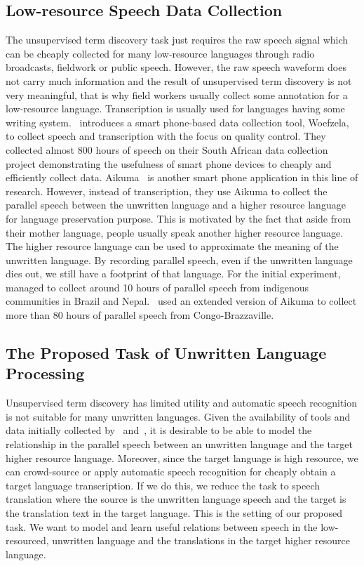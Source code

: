 \documentclass[12pt,twoside,final,hidelinks]{ltthesis}
\theoremstyle{definition}
\begin{document}
\subsection{Low-resource Speech Data Collection}
The unsupervised term discovery task just requires the raw speech signal which can be cheaply collected for many low-resource languages through radio broadcasts, fieldwork 
or public speech. However, the raw speech waveform does not carry much information and the result of unsupervised term discovery is not very meaningful, that is why field workers usually collect some annotation for a low-resource 
language. Transcription is usually used for languages having some writing system.~ introduces a smart phone-based data collection tool, 
Woefzela, to collect speech and transcription with the focus on quality control. They collected almost 800 hours of speech on their South African data collection 
project demonstrating the usefulness of smart phone devices to cheaply and efficiently collect data. Aikuma~\cite{bird-EtAl:2014:W14-22} is another smart phone application in this 
line of research. However, instead of transcription, they use Aikuma to collect the parallel speech between the unwritten language and a higher resource language for language preservation purpose. This 
is motivated by the fact that aside from their mother language, people usually speak another higher resource language. The higher resource language can be used to 
approximate the meaning of the unwritten language. By recording parallel speech, even if the unwritten language dies out, we still have a footprint of that 
language. For the initial experiment,~ managed to collect around 10 hours of parallel speech from indigenous 
communities in Brazil and Nepal.~ used an extended version of Aikuma to collect more than 80 hours of parallel speech from Congo-Brazzaville. 

\subsection{The Proposed Task of Unwritten Language Processing}
\label{sec:proposed_tasks_unwritten}
Unsupervised term discovery has limited utility and automatic speech recognition is not suitable for many unwritten languages. Given the availability of tools and data initially collected by~ and~, it is desirable to be able to model the relationship in the parallel speech between an unwritten language and the target higher resource language. Moreover, since the target language is high resource, we can crowd-source or apply automatic speech recognition for cheaply obtain a target language transcription. If we do this, we reduce the task to speech translation where the source is the unwritten language speech and the target is the translation text in the target language. This is the setting of our proposed task. We want to model and learn useful relations between speech in the low-resourced, unwritten language and the translations in the target higher resource language. 
\end{document}
